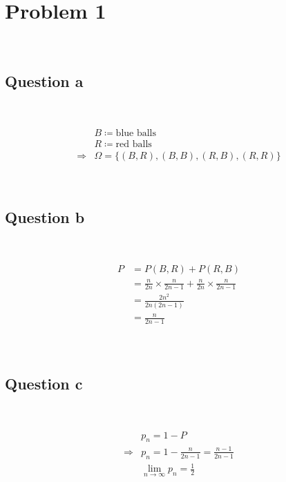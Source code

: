 \documentclass{article}
\begin{document}
\section*{Problem 1}

~

\subsection*{Question a}

~

\begin{equation*}
    \begin{split}
        &B\coloneqq \text{blue balls}\\
        &R\coloneqq \text{red balls}\\
        \Rightarrow&\Omega =\{(B,R),(B,B),(R,B),(R,R)\}
    \end{split}
\end{equation*}

~

\subsection*{Question b}

~

\begin{equation*}
    \begin{split}
        P&=P(B,R)+P(R,B)\\
        &=\frac{n}{2n}\times\frac{n}{2n-1}+\frac{n}{2n}\times\frac{n}{2n-1}\\
        &=\frac{2n^2}{2n(2n-1)}\\
        &=\frac{n}{2n-1}\\
    \end{split}
\end{equation*}

~

\subsection*{Question c}

~

\begin{equation*}
    \begin{split}
        &p_n=1-P\\
        \Rightarrow&p_n=1-\frac{n}{2n-1}=\frac{n-1}{2n-1}\\
        &\lim_{n\rightarrow\infty}p_n=\frac{1}{2}\\
    \end{split}
\end{equation*}
\end{document}
